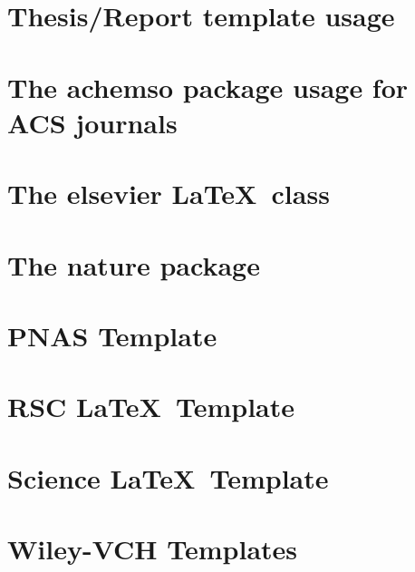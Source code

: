 \section{Thesis/Report template usage}

\section{The achemso package usage for ACS journals}

\section{The elsevier \LaTeX\ class}

\section{The nature package}

\section{PNAS Template}

\section{RSC \LaTeX\ Template}

\section{Science \LaTeX\ Template}

\section{Wiley-VCH Templates}






